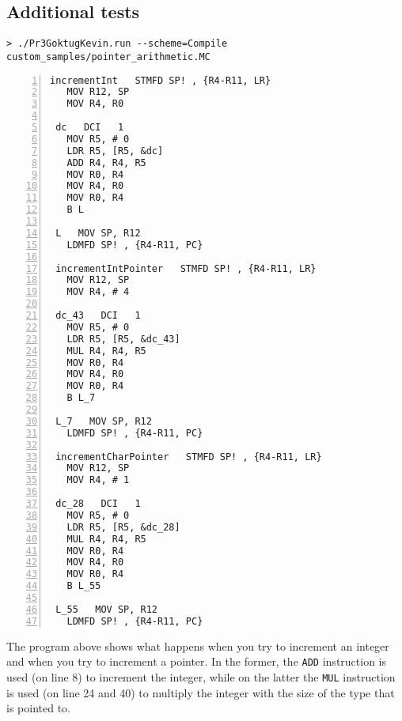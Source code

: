 \documentclass{article}
\begin{document}
\subsection{Additional tests}

\begin{verbatim}
> ./Pr3GoktugKevin.run --scheme=Compile custom_samples/pointer_arithmetic.MC
\end{verbatim}
\begin{Verbatim}[numbers=left,xleftmargin=5mm]
 incrementInt   STMFD SP! , {R4-R11, LR}  
   MOV R12, SP  
   MOV R4, R0  
   
 dc   DCI   1   
   MOV R5, # 0   
   LDR R5, [R5, &dc]  
   ADD R4, R4, R5  
   MOV R0, R4  
   MOV R4, R0  
   MOV R0, R4  
   B L  
   
 L   MOV SP, R12  
   LDMFD SP! , {R4-R11, PC}  
   
 incrementIntPointer   STMFD SP! , {R4-R11, LR}  
   MOV R12, SP  
   MOV R4, # 4   
   
 dc_43   DCI   1   
   MOV R5, # 0   
   LDR R5, [R5, &dc_43]  
   MUL R4, R4, R5  
   MOV R0, R4  
   MOV R4, R0  
   MOV R0, R4  
   B L_7  
   
 L_7   MOV SP, R12  
   LDMFD SP! , {R4-R11, PC}  
   
 incrementCharPointer   STMFD SP! , {R4-R11, LR}  
   MOV R12, SP  
   MOV R4, # 1   
   
 dc_28   DCI   1   
   MOV R5, # 0   
   LDR R5, [R5, &dc_28]  
   MUL R4, R4, R5  
   MOV R0, R4  
   MOV R4, R0  
   MOV R0, R4  
   B L_55  
   
 L_55   MOV SP, R12  
   LDMFD SP! , {R4-R11, PC}  
\end{Verbatim}

The program above shows what happens when you try to increment an integer and when you try to increment a pointer. In the former, the \verb|ADD| instruction is used (on line 8) to increment the integer, while on the latter the \verb|MUL| instruction is used (on line 24 and 40) to multiply the integer with the size of the type that is pointed to.
\end{document}
